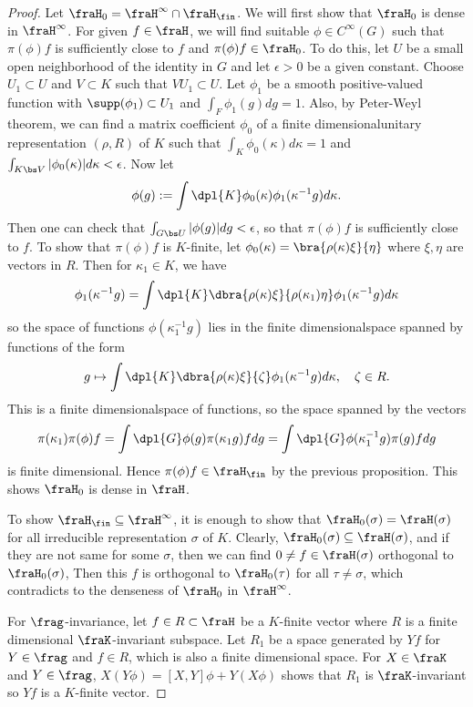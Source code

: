 \documentclass{article}
\begin{document}
\begin{proof}
Let $\fraH_{0} = \fraH^{\infty} \cap \fraH_{\fin}$. 
We will first show that $\fraH_{0}$ is dense in $\fraH^{\infty}$. 
For given $f\in \fraH$, we will find suitable $\phi \in C^{\infty}(G)$ such that $\pi(\phi)f$ is sufficiently close to $f$ and $\pi(\phi)f \in \fraH_{0}$. 
To do this, let $U$ be a small open neighborhood of the identity in $G$ and let $\epsilon >0$ be a given constant. 
Choose $U_{1} \subset U$ and $V\subset K$ such that $VU_{1} \subset U$. 
Let $\phi_1$ be a smooth positive-valued function with $\supp(\phi_1)\subset U_1$ and $\int_{F} \phi_{1}(g) dg = 1$. Also, by Peter-Weyl theorem, we can find a matrix coefficient $\phi_0$ of a finite dimensionalunitary representation $(\rho, R)$ of $K$ such that $\int_{K} \phi_0(\kappa)d\kappa = 1$ and $\int_{K\bs V} |\phi_{0}(\kappa)| d\kappa < \epsilon$. 
Now let
$$
\phi(g) := \int\dpl{K} \phi_{0}(\kappa) \phi_{1}(\kappa^{-1}g)d\kappa.
$$
Then one can check that $\int_{G\bs U} |\phi(g)|dg < \epsilon$, so that $\pi(\phi)f$ is sufficiently close to $f$. 
To show that $\pi(\phi)f$ is $K$-finite, let $\phi_{0}(\kappa) = \bra{\rho(\kappa)\xi}{\eta}$ where $\xi, \eta$ are vectors in $R$. 
Then for $\kappa_1\in K$, we have
\begin{align*}
\phi_{1}(\kappa^{-1}g) = \int\dpl{K} \dbra{\rho(\kappa)\xi}{\rho(\kappa_1)\eta} \phi_1(\kappa^{-1}g)d\kappa
\end{align*}
so the space of functions $\phi(\kappa_{1}^{-1}g)$ lies in the finite dimensionalspace spanned by functions of the form 
$$
g\mapsto \int\dpl{K} \dbra{\rho(\kappa)\xi}{\zeta} \phi_{1}(\kappa^{-1}g)d\kappa, \quad \zeta\in R.
$$
This is a finite dimensionalspace of functions, so the space spanned by the vectors 
$$
\pi(\kappa_1) \pi(\phi)f = \int\dpl{G}\phi(g)\pi(\kappa_{1}g)fdg = \int\dpl{G} \phi(\kappa_{1}^{-1}g)\pi(g)fdg
$$
is finite dimensional. Hence $\pi(\phi)f\in \fraH_{\fin}$ by the previous proposition. This shows $\fraH_0$ is dense in $\fraH$. 

To show $\fraH_\fin \subseteq \fraH^{\infty}$, it is enough to show that $\fraH_{0}(\sigma) = \fraH(\sigma)$ for all irreducible representation $\sigma$ of $K$. 
Clearly, $\fraH_{0}(\sigma) \subseteq \fraH(\sigma)$, and if they are not same for some $\sigma$, then we can find $0\neq f\in \fraH(\sigma)$ orthogonal to $\fraH_{0}(\sigma)$, 
Then this $f$ is orthogonal to $\fraH_{0}(\tau)$ for all $\tau \neq \sigma$, which contradicts to the denseness of $\fraH_{0}$ in $\fraH^{\infty}$. 

For $\frag$-invariance, let $f\in R\subset \fraH$ be a $K$-finite vector where $R$ is a finite dimensional  $\fraK$-invariant subspace. 
Let $R_{1}$ be a space generated by $Yf$ for $Y\in \frag$ and $f\in R$, which is also a finite dimensional space. For $X\in \fraK$ and $Y\in \frag$, $X(Y\phi) = [X, Y]\phi + Y(X\phi)$ shows that $R_{1}$ is $\fraK$-invariant so $Yf$ is a $K$-finite vector. 
\end{proof}
\end{document}
